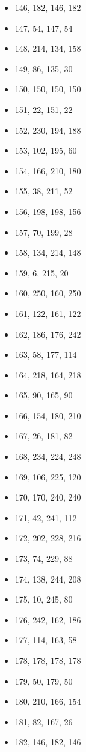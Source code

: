 \documentclass[12pt, fleqn]{report}                             %
\theoremstyle{break}                                            %
\begin{document}
\begin{multicols}{3}
\begin{itemize}
        \item 146, 182, 146, 182
        \item 147, 54, 147, 54
        \item 148, 214, 134, 158
        \item 149, 86, 135, 30
        \item 150, 150, 150, 150
        \item 151, 22, 151, 22
        \item 152, 230, 194, 188
        \item 153, 102, 195, 60
        \item 154, 166, 210, 180
        \item 155, 38, 211, 52
        \item 156, 198, 198, 156
        \item 157, 70, 199, 28
        \item 158, 134, 214, 148
        \item 159, 6, 215, 20
        \item 160, 250, 160, 250
        \item 161, 122, 161, 122
        \item 162, 186, 176, 242
        \item 163, 58, 177, 114
        \item 164, 218, 164, 218
        \item 165, 90, 165, 90
        \item 166, 154, 180, 210
        \item 167, 26, 181, 82
        \item 168, 234, 224, 248
        \item 169, 106, 225, 120
        \item 170, 170, 240, 240
        \item 171, 42, 241, 112
        \item 172, 202, 228, 216
        \item 173, 74, 229, 88
        \item 174, 138, 244, 208
        \item 175, 10, 245, 80
        \item 176, 242, 162, 186
        \item 177, 114, 163, 58
        \item 178, 178, 178, 178
        \item 179, 50, 179, 50
        \item 180, 210, 166, 154
        \item 181, 82, 167, 26
        \item 182, 146, 182, 146

\end{itemize}
\end{multicols}
\end{document}
